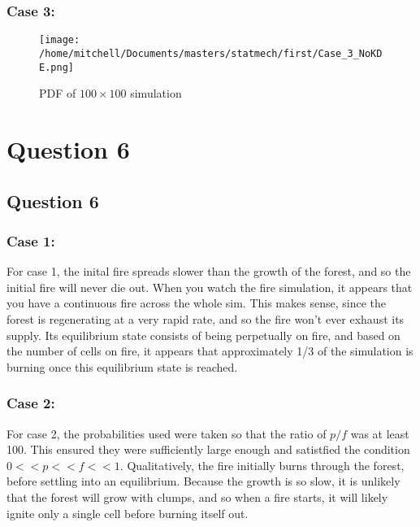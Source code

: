 \documentclass[11pt,a4paper]{article}
\begin{document}
\subsubsection{Case 3:}

\begin{figure}[H]
\centering
\texttt{[image: /home/mitchell/Documents/masters/statmech/first/Case\_3\_NoKDE.png]}
\caption{PDF of $100 \times 100$ simulation}
\end{figure}


\section{Question 6}
\label{sec:question6}


\subsection{Question 6}
\label{sec:question6:subsec:parta}

\subsubsection{Case 1:}
For case 1, the inital fire spreads slower than the growth of the forest, and so the initial fire will never die out. When you watch the fire simulation, it appears that you have a continuous fire across the whole sim. This makes sense, since the forest is regenerating at a very rapid rate, and so the fire won't ever exhaust its supply. Its equilibrium state consists of being perpetually on fire, and based on the number of cells on fire, it appears that approximately 1/3 of the simulation is burning once this equilibrium state is reached.

\subsubsection{Case 2:}
For case 2, the probabilities used were taken so that the ratio of $p/f$ was at least 100. This ensured they were sufficiently large enough and satistfied the condition $0 << p << f << 1$. Qualitatively, the fire initially burns through the forest, before settling into an equilibrium. Because the growth is so slow, it is unlikely that the forest will grow with clumps, and so when a fire starts, it will likely ignite only a single cell before burning itself out. 
\end{document}
